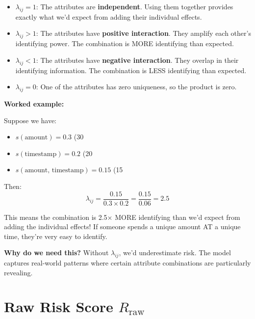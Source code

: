 \documentclass[12pt,a4paper,oneside,openany]{report}
\begin{document}
\begin{itemize}
    \item $\lambda_{ij} = 1$: The attributes are \textbf{independent}. Using them together provides exactly what we'd expect from adding their individual effects.
    
    \item $\lambda_{ij} > 1$: The attributes have \textbf{positive interaction}. They amplify each other's identifying power. The combination is MORE identifying than expected.
    
    \item $\lambda_{ij} < 1$: The attributes have \textbf{negative interaction}. They overlap in their identifying information. The combination is LESS identifying than expected.
    
    \item $\lambda_{ij} = 0$: One of the attributes has zero uniqueness, so the product is zero.
\end{itemize}

\textbf{Worked example:}

Suppose we have:
\begin{itemize}
    \item $s(\text{amount}) = 0.3$ (30%
    \item $s(\text{timestamp}) = 0.2$ (20%
    \item $s(\text{amount, timestamp}) = 0.15$ (15%
\end{itemize}

Then:
\begin{equation}
\lambda_{ij} = \frac{0.15}{0.3 \times 0.2} = \frac{0.15}{0.06} = 2.5
\end{equation}

This means the combination is 2.5× MORE identifying than we'd expect from adding the individual effects! If someone spends a unique amount AT a unique time, they're very easy to identify.

\textbf{Why do we need this?} Without $\lambda_{ij}$, we'd underestimate risk. The model captures real-world patterns where certain attribute combinations are particularly revealing.

\section{Raw Risk Score $R_{\mathrm{raw}}$}
\label{sec:raw}
\end{document}
